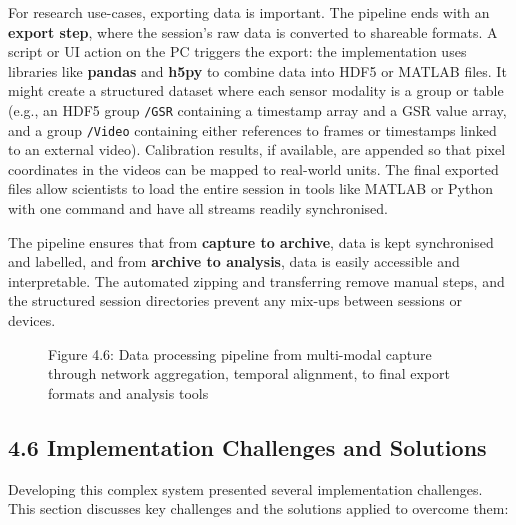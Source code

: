 \documentclass[12pt,a4paper]{article}
\begin{document}
For research use-cases, exporting data is important. The pipeline ends with an \textbf{export step}, where the session's raw data is converted to shareable formats. A script or UI action on the PC triggers the export: the implementation uses libraries like \textbf{pandas} and \textbf{h5py} to combine data into HDF5 or MATLAB files. It might create a structured dataset where each sensor modality is a group or table (e.g., an HDF5 group \passthrough{\lstinline!/GSR!} containing a timestamp array and a GSR value array, and a group \passthrough{\lstinline!/Video!} containing either references to frames or timestamps linked to an external video). Calibration results, if available, are appended so that pixel coordinates in the videos can be mapped to real-world units. The final exported files allow scientists to load the entire session in tools like MATLAB or Python with one command and have all streams readily synchronised.

The pipeline ensures that from \textbf{capture to archive}, data is kept synchronised and labelled, and from \textbf{archive to analysis}, data is easily accessible and interpretable. The automated zipping and transferring remove manual steps, and the structured session directories prevent any mix-ups between sessions or devices.

\begin{figure}
\centering
{}
\caption{Figure 4.6: Data processing pipeline from multi-modal capture through network aggregation, temporal alignment, to final export formats and analysis tools}
\end{figure}

\subsection{4.6 Implementation Challenges and Solutions}\label{implementation-challenges-and-solutions}

Developing this complex system presented several implementation challenges. This section discusses key challenges and the solutions applied to overcome them:
\end{document}
